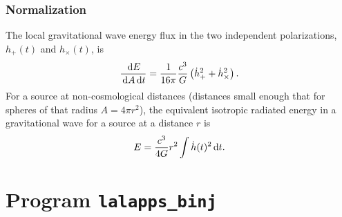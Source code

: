 \documentclass[10pt]{article}
\newcommand{\prog}[1]{\texttt{#1}}
\begin{document}
\subsubsection{Normalization}


The local gravitational wave energy flux in the two independent
polarizations, \(h_{+}(t)\) and \(h_{\times}(t)\), is
\begin{equation}
\frac{\,\mathrm{d} E}{\,\mathrm{d} A \,\mathrm{d} t}
   = \frac{1}{16 \pi} \frac{c^{3}}{G} \left( \dot{h}_{+}^{2} +
   \dot{h}_{\times}^{2} \right).
\end{equation}
For a source at non-cosmological distances (distances small enough that for
spheres of that radius \(A = 4 \pi r^{2}\)), the equivalent isotropic
radiated energy in a gravitational wave for a source at a distance \(r\) is
\begin{equation}
E
   = \frac{c^{3}}{4 G} r^{2} \int \dot{h}(t)^{2} \,\mathrm{d} t.
\end{equation}


\section{Program \prog{lalapps\_binj}}
\label{program:lalapps-binj}
\end{document}

